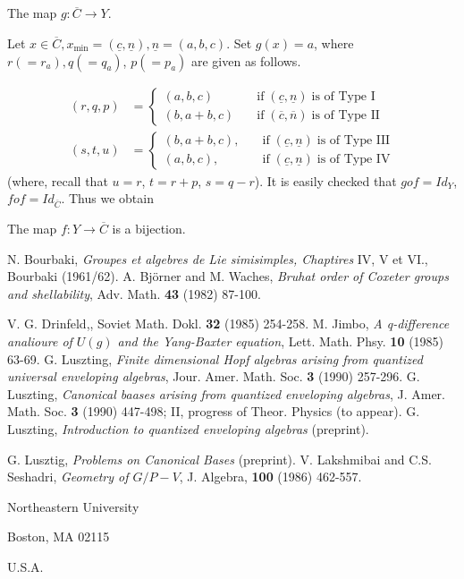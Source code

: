 \subsection{}\label{art9-subsec-8.4}
 The map $g : \overline{C} \longrightarrow Y$.

 Let $x \in \overline{C}, x_{\min}= (\underline{c}, \underline{n}), \underline{n} =(a,b,c)$. Set $g(x) = a$, where $r(=r_{a}), q(=q_{a})$, $p(=p_{a})$ are given as follows.

 \begin{align*}
(r, q,p)&=
 \begin{cases}
(a,b,c) \quad &\text{if} \; (\underline{c}, \underline{n})\; \text{is of Type I}\\
(b,a+b,c)\quad &\text{if} \; (\overline{c}, \overline{n})\; \text{is of Type II}
 \end{cases}\\
 (s,t,u)&=
 \begin{cases}
(b,a+b,c), \quad &\text{if} \; (\underline{c}, \underline{n})\; \text{is of Type III}\\
(a,b,c), \quad &\text{if} \; (\underline{c}, \underline{n})\; \text{is of Type IV}
 \end{cases}
 \end{align*}
(where, recall that $u=r$, $t=r + p$, $s=q-r$). It is easily checked that  $gof =Id_{Y}$, $fof=Id_{\overline{C}}$.
Thus we obtain

\setcounter{theorem}{4}
\begin{theorem}
The map $f: Y \longrightarrow \overline{C}$ is a bijection.
\end{theorem}

\begin{thebibliography}{99}
 N. Bourbaki, \textit{Groupes et algebres de Lie simisimples, Chaptires} IV, V et VI., Bourbaki (1961/62).
A. Bj\"orner and M. Waches, \textit{Bruhat order of Coxeter groups and shellability}, Adv. Math. {\bf 43} (1982) 87-100.

 V. G. Drinfeld,, Soviet Math. Dokl. {\bf 32} (1985) 254-258. 
 M. Jimbo, \textit{A q-difference analioure of $U(g)$ and the Yang-Baxter equation}, Lett. Math. Phsy. {\bf 10} (1985) 63-69.
G. Luszting, \textit{Finite dimensional Hopf algebras arising from quantized universal enveloping algebras}, Jour. Amer. Math. Soc. {\bf 3} (1990) 257-296.
 G. Luszting, \textit{Canonical baases arising from quantized enveloping algebras}, J. Amer. Math. Soc. {\bf 3} (1990) 447-498; II, progress of Theor. Physics (to appear).
 G. Luszting, \textit{Introduction to quantized enveloping algebras} (preprint).

 G. Lusztig, \textit{Problems on Canonical Bases} (preprint).
V. Lakshmibai and C.S. Seshadri, \textit{Geometry of $G/P-V$}, J. Algebra, {\bf 100} (1986) 462-557.
\end{thebibliography}

\begin{flushleft}
Northeastern University

Boston, MA 02115

U.S.A.
\end{flushleft}
